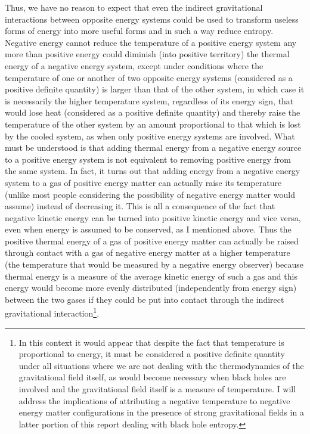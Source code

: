 \documentclass[notitlepage,12pt]{report}
\begin{document}
Thus, we have no reason to expect that even the indirect gravitational interactions between opposite energy systems could be used to transform useless forms of energy into more useful forms and in such a way reduce entropy. Negative energy cannot reduce the temperature of a positive energy system any more than positive energy could diminish (into positive territory) the thermal energy of a negative energy system, except under conditions where the temperature of one or another of two opposite energy systems (considered as a positive definite quantity) is larger than that of the other system, in which case it is necessarily the higher temperature system, regardless of its energy sign, that would lose heat (considered as a positive definite quantity) and thereby raise the temperature of the other system by an amount proportional to that which is lost by the cooled system, as when only positive energy systems are involved. What must be understood is that adding thermal energy from a negative energy source to a positive energy system is not equivalent to removing positive energy from the same system. In fact, it turns out that adding energy from a negative energy system to a gas of positive energy matter can actually raise its temperature (unlike most people considering the possibility of negative energy matter would assume) instead of decreasing it. This is all a consequence of the fact that negative kinetic energy can be turned into positive kinetic energy and vice versa, even when energy is assumed to be conserved, as I mentioned above. Thus the positive thermal energy of a gas of positive energy matter can actually be raised through contact with a gas of negative energy matter at a higher temperature (the temperature that would be measured by a negative energy observer) because thermal energy is a measure of the average kinetic energy of such a gas and this energy would become more evenly distributed (independently from energy sign) between the two gases if they could be put into contact through the indirect gravitational interaction\footnote{In this context it would appear that despite the fact that temperature is proportional to energy, it must be considered a positive definite quantity under all situations where we are not dealing with the thermodynamics of the gravitational field itself, as would become necessary when black holes are involved and the gravitational field itself is a measure of temperature. I will address the implications of attributing a negative temperature to negative energy matter configurations in the presence of strong gravitational fields in a latter portion of this report dealing with black hole entropy.}.
\end{document}

